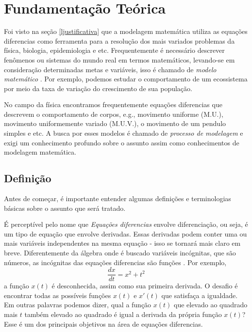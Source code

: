 \section{Fundamentação Teórica}\label{lfundamentacao}
Foi visto na seção \ref{ljustificativa} que a modelagem matemática 
utiliza as equações diferencias como ferramenta para a resolução dos 
mais variados problemas da física, biologia, epidemiologia e etc.
Frequentemente é necessário descrever fenômenos ou sistemas do mundo
real em termos matemáticos, levando-se em consideração determinadas metas
e variáveis, isso é chamado de \emph{modelo matemático} \cite{zill2003equacoes}.
Por exemplo, podemos estudar o comportamento de um ecossistema por meio da taxa
de variação do crescimento de sua população.

No campo da física encontramos frequentemente equações diferencias que descrevem
o comportamento de corpos, e.g., movimento uniforme (M.U.), movimento uniformemente
variado (M.U.V.), o movimento de um pendulo simples e etc.
A busca por esses modelos é chamado de \emph{processo de modelagem} e exigi 
um conhecimento profundo sobre o assunto assim como conhecimentos de 
modelagem matemática.

\subsection{Definição}

Antes de começar, é importante entender algumas definições e terminologias 
básicas sobre o assunto que será tratado.

É perceptível pelo nome que \emph{Equações diferencias} envolve 
diferenciação, ou seja, é um tipo de equação que envolve derivadas.
Essas derivadas podem conter uma ou mais variáveis independentes na mesma 
equação - isso se tornará mais claro em breve. Diferentemente da álgebra onde
é buscado variáveis incógnitas, que são números, as incógnitas das equações diferencias são 
funções \cite{diacu}. Por exemplo,
\begin{equation*}
\frac{dx}{dt} = x^{2} + t^{2}
\end{equation*}
a função $x(t)$ é desconhecida, assim como sua primeira derivada. O desafio é
encontrar todas as possíveis funções $x(t)$ e $x'(t)$ que satisfaça a igualdade.
Em outras palavras podemos dizer, qual a função $x(t)$ que elevado ao quadrado mais
$t$ também elevado ao quadrado é igual a derivada da própria função $x(t)$?
Esse é um dos principais objetivos na área de equações diferencias.

